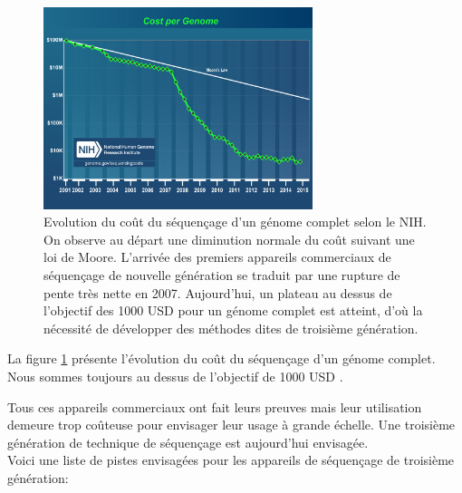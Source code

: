 \documentclass[a4paper,11pt]{article}
\begin{document}
\begin{figure}[H]
\begin{center}
\includegraphics[width=0.7\textwidth]{cost_genome.jpg}

\caption{Evolution du coût du séquençage d'un génome complet selon le NIH. On observe au départ une diminution normale du coût suivant une loi de Moore. L'arrivée des premiers appareils commerciaux de séquençage de nouvelle génération se traduit par une rupture de pente très nette en 2007. Aujourd'hui, un plateau au dessus de l'objectif des 1000 USD pour un génome complet est atteint, d'où la nécessité de développer des méthodes dites de troisième génération.}
\label{seqcost}
\end{center}
\end{figure}

La figure \ref{seqcost} présente l'évolution du coût du séquençage d'un génome complet. Nous sommes toujours au dessus de l'objectif de 1000 USD \cite{Mardis2006}.

Tous ces appareils commerciaux  ont fait leurs preuves mais leur utilisation demeure trop coûteuse pour envisager leur usage à grande échelle. Une troisième génération de technique de séquençage est aujourd'hui envisagée.\\

Voici une liste de pistes envisagées pour les appareils de séquençage de troisième génération:
\end{document}
